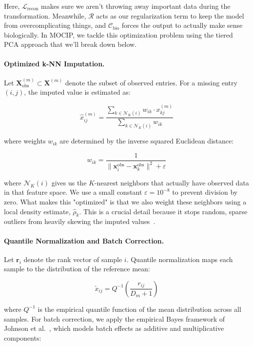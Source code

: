 \documentclass[runningheads]{llncs}
\begin{document}
Here, $\mathcal{L}_{\text{recon}}$ makes sure we aren't throwing away important data during the transformation. Meanwhile, $\mathcal{R}$ acts as our regularization term to keep the model from overcomplicating things, and $\mathcal{C}_{\text{bio}}$ forces the output to actually make sense biologically. In MOCIP, we tackle this optimization problem using the tiered PCA approach that we'll break down below.

\paragraph{Optimized k-NN Imputation.}
Let $\mathbf{X}^{(m)}_{\text{obs}} \subset \mathbf{X}^{(m)}$ denote the subset of observed entries. For a missing entry $(i, j)$, the imputed value is estimated as:

\begin{equation}
\hat{x}^{(m)}_{ij} = \frac{\sum_{k \in \mathcal{N}_K(i)} w_{ik} \cdot x^{(m)}_{kj}}{\sum_{k \in \mathcal{N}_K(i)} w_{ik}}
\end{equation}

where weights $w_{ik}$ are determined by the inverse squared Euclidean distance:

\begin{equation}
w_{ik} = \frac{1}{\|\mathbf{x}_i^{\text{obs}} - \mathbf{x}_k^{\text{obs}}\|^2 + \varepsilon}
\end{equation}

where $\mathcal{N}_K(i)$ gives us the $K$-nearest neighbors that actually have observed data in that feature space. We use a small constant $\varepsilon = 10^{-8}$ to prevent division by zero. What makes this "optimized" is that we also weight these neighbors using a local density estimate, $\hat{\rho}_k$. This is a crucial detail because it stops random, sparse outliers from heavily skewing the imputed values~\cite{troyanskaya2001}.

\paragraph{Quantile Normalization and Batch Correction.}
Let $\mathbf{r}_i$ denote the rank vector of sample $i$. Quantile normalization maps each sample to the distribution of the reference mean:

\begin{equation}
\tilde{x}_{ij} = Q^{-1}\left(\frac{r_{ij}}{D_m + 1}\right)
\end{equation}

where $Q^{-1}$ is the empirical quantile function of the mean distribution across all samples. For batch correction, we apply the empirical Bayes framework of Johnson et al.~\cite{johnson2007}, which models batch effects as additive and multiplicative components:
\end{document}

